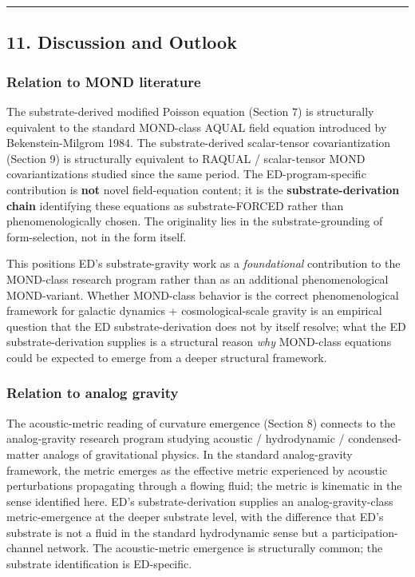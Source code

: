 \documentclass[
]{article}
\begin{document}
\begin{center}\rule{0.5\linewidth}{0.5pt}\end{center}

\subsection{11. Discussion and Outlook}\label{discussion-and-outlook}

\subsubsection{Relation to MOND
literature}\label{relation-to-mond-literature}

The substrate-derived modified Poisson equation (Section 7) is
structurally equivalent to the standard MOND-class AQUAL field equation
introduced by Bekenstein-Milgrom 1984. The substrate-derived
scalar-tensor covariantization (Section 9) is structurally equivalent to
RAQUAL / scalar-tensor MOND covariantizations studied since the same
period. The ED-program-specific contribution is \textbf{not} novel
field-equation content; it is the \textbf{substrate-derivation chain}
identifying these equations as substrate-FORCED rather than
phenomenologically chosen. The originality lies in the
substrate-grounding of form-selection, not in the form itself.

This positions ED's substrate-gravity work as a \emph{foundational}
contribution to the MOND-class research program rather than as an
additional phenomenological MOND-variant. Whether MOND-class behavior is
the correct phenomenological framework for galactic dynamics +
cosmological-scale gravity is an empirical question that the ED
substrate-derivation does not by itself resolve; what the ED
substrate-derivation supplies is a structural reason \emph{why}
MOND-class equations could be expected to emerge from a deeper
structural framework.

\subsubsection{Relation to analog
gravity}\label{relation-to-analog-gravity}

The acoustic-metric reading of curvature emergence (Section 8) connects
to the analog-gravity research program studying acoustic / hydrodynamic
/ condensed-matter analogs of gravitational physics. In the standard
analog-gravity framework, the metric emerges as the effective metric
experienced by acoustic perturbations propagating through a flowing
fluid; the metric is kinematic in the sense identified here. ED's
substrate-derivation supplies an analog-gravity-class metric-emergence
at the deeper substrate level, with the difference that ED's substrate
is not a fluid in the standard hydrodynamic sense but a
participation-channel network. The acoustic-metric emergence is
structurally common; the substrate identification is ED-specific.
\end{document}
